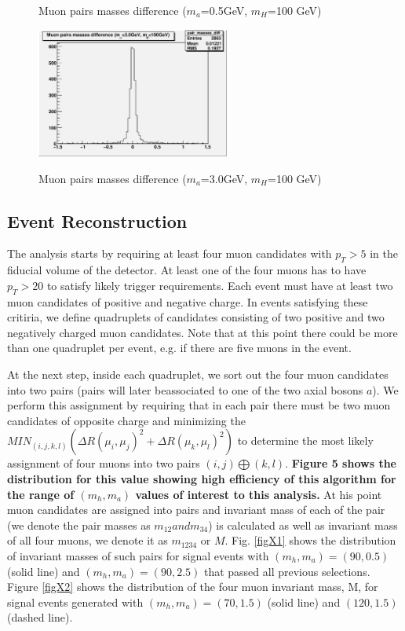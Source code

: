 \documentclass[aps,prd,onecolumn,superscriptaddress,showpacs]{revtex4}
\begin{document}
\begin{figure}[htb]
\begin{center}
\caption{Muon pairs masses difference ($m_a$=0.5GeV, $m_H$=100 GeV)}
\label{muon_pairs_masses_diff_0.5}
\includegraphics[width=15pc]{plots/pairs_masses_diff_3.0.eps}
\caption{Muon pairs masses difference ($m_a$=3.0GeV, $m_H$=100 GeV)}
\label{muon_pairs_masses_diff_3.0}
\end{center}
\end{figure}


\subsection{Event Reconstruction}
The analysis starts by requiring at least four muon candidates with $p_T>5$ \gevc in the fiducial volume of the
detector. At least one of the four muons has to have $p_T>20$ \gevc to satisfy likely trigger requirements. Each
event must have at least two muon candidates of positive and negative charge. In events satisfying these 
critiria, we define quadruplets of candidates consisting of two positive and two negatively charged muon
candidates. Note that at this point there could be more than one quadruplet per event, e.g. if there are 
five muons in the event. 

At the next step, inside each quadruplet, we sort out the four muon candidates into two pairs (pairs will 
later beassociated to one of the two axial bosons $a$). We perform this assignment by requiring that in each pair
there must be two muon candidates of opposite charge and minimizing the $MIN_{(i,j,k,l)} (\Delta R(\mu_i,\mu_j)^2 + \Delta R (\mu_k,\mu_l)^2)$ 
to determine the most likely assignment of four muons into two pairs $(i,j)\bigoplus(k,l)$. {\bf Figure 5 shows the 
distribution for this value showing high efficiency of this algorithm for the range of $(m_h, m_a)$ values of interest 
to this analysis.} At his point muon candidates are assigned into pairs and invariant mass of each of the pair (we denote the pair masses 
as $m_{12} and m_{34}$) is calculated as well as invariant mass of all four muons, we denote it as $m_{1234}$ or $M$. 
Fig. \ref{figX1} shows the distribution of invariant masses of such pairs for signal events with $(m_h,m_a)=(90,0.5)$ 
\gevcc (solid line) and $(m_h,m_a)=(90,2.5)$ \gevcc that passed all previous selections. Figure \ref{figX2} shows the distribution of 
the four muon invariant mass, M, for signal events generated with $(m_h,m_a)=(70,1.5)$ (solid line) and $(120, 1.5)$ \gevcc (dashed line).
\end{document}
